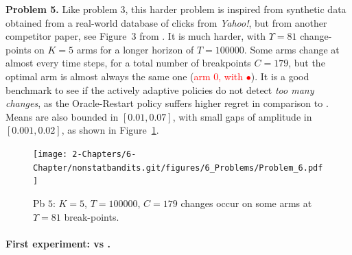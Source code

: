 \textbf{Problem 5.}
%
Like problem $3$, this harder problem is inspired from synthetic data obtained from a real-world database of clicks from \emph{Yahoo!}, but from another competitor paper, see Figure~3 from \cite{LiuLeeShroff17}.
%
It is much harder, with $\Upsilon=81$ change-points on $K=5$ arms for a longer horizon of $T=100000$.
Some arms change at almost every time steps, for a total number of breakpoints $C=179$, but the optimal arm is almost always the same one (\textcolor{red}{arm $0$, with $\bullet$}).
It is a good benchmark to see if the actively adaptive policies do not detect \emph{too many changes}, as the Oracle-Restart policy suffers higher regret in comparison to \klUCB.
Means are also bounded in $[0.01, 0.07]$, with small gaps of amplitude in $[0.001, 0.02]$,
as shown in Figure~\ref{fig:6:Problem_6}.

\begin{figure}[h!]  %
    \centering
    \texttt{[image: 2-Chapters/6-Chapter/nonstatbandits.git/figures/6\_Problems/Problem\_6.pdf]}
    \caption{Pb $5$: $K=5$, $T=100000$, $C=179$ changes occur on some arms at $\Upsilon=81$ break-points.}
    \label{fig:6:Problem_6}
\end{figure}





\paragraph{First experiment: \UCB{} vs \klUCB{}.}
%


